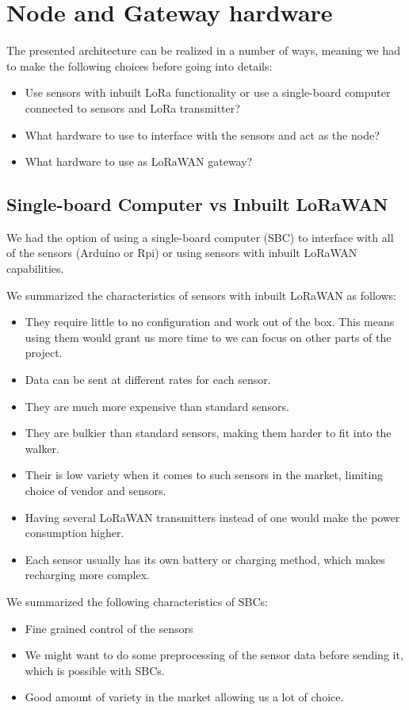 \section{Node and Gateway hardware}
	The presented architecture can be realized in a number of ways, meaning we had to make the following choices before going into details:

	\begin{itemize}
		\item Use sensors with inbuilt LoRa functionality or use a single-board computer connected to sensors and LoRa transmitter?
		\item What hardware to use to interface with the sensors and act as the node?
		\item What hardware to use as LoRaWAN gateway?
	\end{itemize}


	\subsection{Single-board Computer vs Inbuilt LoRaWAN}

		We had the option of using a single-board computer (SBC) to interface with all of the sensors (Arduino or Rpi) or using sensors with inbuilt LoRaWAN capabilities.

		We summarized the characteristics of sensors with inbuilt LoRaWAN as follows:
		\begin{itemize}
			\item They require little to no configuration and work out of the box. This means using them would grant us more time to we can focus on other parts of the project.
			\item Data can be sent at different rates for each sensor.
			\item They are much more expensive than standard sensors.
			\item They are bulkier than standard sensors, making them harder to fit into the walker.
			\item Their is low variety when it comes to such sensors in the market, limiting choice of vendor and sensors.
			\item Having several LoRaWAN transmitters instead of one would make the power consumption higher.
			\item Each sensor usually has its own battery or charging method, which makes recharging more complex.
		\end{itemize}


		We summarized the following characteristics of SBCs:
		\begin{itemize}
			\item Fine grained control of the sensors
			\item We might want to do some preprocessing of the sensor data before sending it, which is possible with SBCs.
			\item Good amount of variety in the market allowing us a lot of choice.
		\end{itemize}

